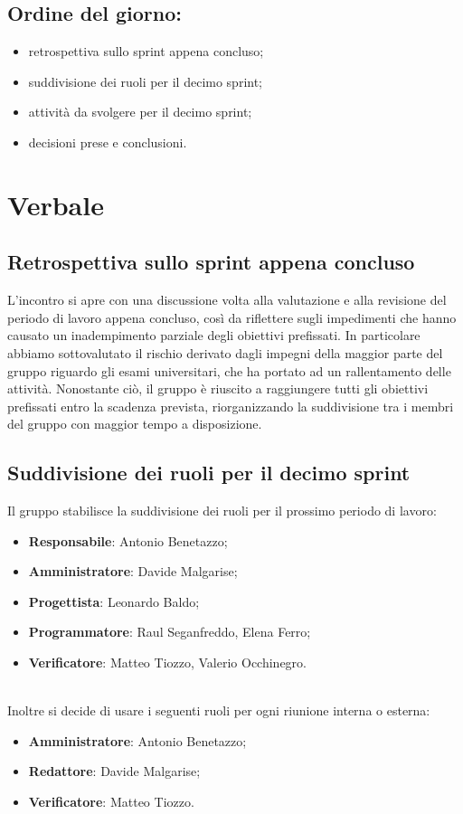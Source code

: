 \documentclass[italian,12pt]{article}
\begin{document}
\subsection*{Ordine del giorno:}
\begin{itemize}
	\item retrospettiva sullo sprint appena concluso;
	\item suddivisione dei ruoli per il decimo sprint;
	\item attività da svolgere per il decimo sprint;
	\item decisioni prese e conclusioni.
\end{itemize}


\newpage

\section{Verbale}

\subsection{Retrospettiva sullo sprint appena concluso}
L'incontro si apre con una discussione volta alla valutazione e alla revisione del periodo di lavoro appena concluso, così da riflettere sugli impedimenti che hanno causato un inadempimento
parziale degli obiettivi prefissati. In particolare abbiamo sottovalutato il rischio derivato dagli impegni della maggior parte del gruppo riguardo gli esami
universitari, che ha portato
ad un rallentamento delle attività. Nonostante ciò, il gruppo è riuscito a raggiungere tutti gli obiettivi prefissati entro la scadenza prevista,
riorganizzando la suddivisione tra i membri del gruppo con maggior tempo a disposizione.\\

\subsection{Suddivisione dei ruoli per il decimo sprint}
Il gruppo stabilisce la suddivisione dei ruoli per il prossimo periodo di lavoro:
\begin{itemize}
	\item \textbf{Responsabile}: Antonio Benetazzo;
	\item \textbf{Amministratore}: Davide Malgarise;
	\item \textbf{Progettista}: Leonardo Baldo;
	\item \textbf{Programmatore}: Raul Seganfreddo, Elena Ferro;
	\item \textbf{Verificatore}: Matteo Tiozzo, Valerio Occhinegro.
\end{itemize}
\\
Inoltre si decide di usare i seguenti ruoli per ogni riunione interna o esterna:
\begin{itemize}
	\item \textbf{Amministratore}: Antonio Benetazzo;
	\item \textbf{Redattore}: Davide Malgarise;
	\item \textbf{Verificatore}: Matteo Tiozzo.
\end{itemize}
\end{document}
